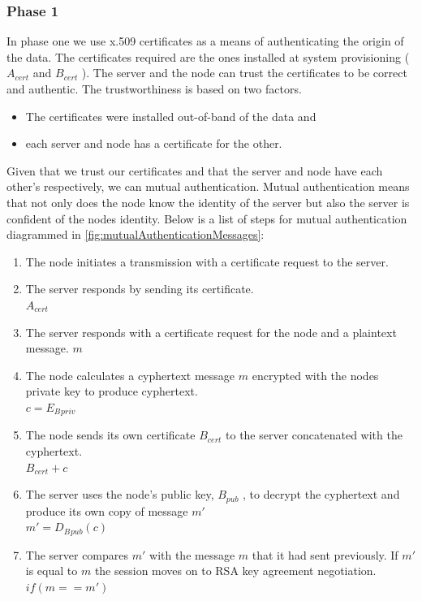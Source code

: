 \subsubsection{Phase 1}
In phase one we use x.509 certificates as a means of authenticating the origin of the data.
The certificates required are the ones installed at system provisioning ( $A{_{cert}}$ and $B{_{cert}}$ ). 
The server and the node can trust the certificates to be correct and authentic. The trustworthiness is based on two factors. 
\begin{itemize}
\item The certificates were installed out-of-band of the data and 
\item each server and node has a certificate for the other. 
\end{itemize}
Given that we trust our certificates and that the server and node have each other’s respectively, we can mutual authentication. 
Mutual authentication means that not only does the node know the identity of the server but also the server is confident of the nodes identity. 
Below is a list of steps for mutual authentication diagrammed in \autoref{fig:mutualAuthenticationMessages}:

\begin{enumerate}
\item The node initiates a transmission with a certificate request to the server. 
\item The server responds by sending its certificate. \\ $A{_{cert}}$ \par
\item The server responds with a certificate request for the node and a plaintext message. $m$
\item The node calculates a cyphertext message $m$ encrypted with the nodes private key to produce cyphertext. \\
$c=E{_B{_{priv}}}$
\item The node sends its own certificate $B{_{cert}}$  to the server concatenated with the cyphertext.  \\$B{_{cert}} + c$
\item The server uses the node’s public key, $B{_{pub}}$ , to decrypt the cyphertext and produce its own copy of message $m'$\\$m'=D{_B{_{pub}}}(c)$
\item The server compares $m′$ with the message $m$ that it had sent previously. If $m'$ is equal to $m$ the session moves on to RSA key agreement negotiation. \\ $if (m == m')$
\end{enumerate}
 
